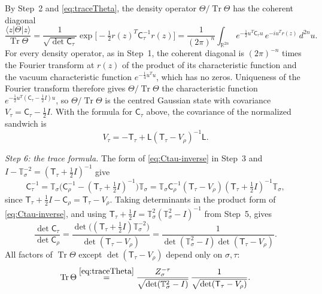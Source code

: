 \documentclass[11pt]{amsart}
\numberwithin{equation}{section}
\theoremstyle{definition}
\newcommand{\R}{\mathbb R}
\newcommand{\Tr}{\operatorname{Tr}}
\begin{document}
By Step~2 and \eqref{eq:traceTheta}, the density operator
\(\Theta/{\Tr\Theta}\) has the coherent diagonal
\[
 \frac{\langle z|\Theta|z\rangle}{\Tr\Theta}
 =\frac1{\sqrt{\det\mathsf C_\tau}}
  \exp\bigl[-\tfrac12r(z)^T\mathsf C_\tau^{-1}r(z)\bigr]
 =\frac1{(2\pi)^n}\int_{\R^{2n}}
  e^{-\frac12u^T\mathsf C_\tau u}\,e^{-iu^Tr(z)}\,d^{2n}u .
\]
For every density operator, as in Step~1, the coherent diagonal is
\((2\pi)^{-n}\) times the Fourier transform at \(r(z)\) of the product
of its characteristic function and the vacuum characteristic function
\(e^{-\frac14u^Tu}\), which has no zeros. Uniqueness of the Fourier
transform therefore gives \(\Theta/{\Tr\Theta}\) the characteristic
function \(e^{-\frac12u^T(\mathsf C_\tau-\frac12I)u}\), so
\(\Theta/{\Tr\Theta}\) is the centred Gaussian state with covariance
\(V_\tau=\mathsf C_\tau-\tfrac12I\). With the formula for
\(\mathsf C_\tau\) above, the covariance of the normalized sandwich is
\begin{equation}
 V_\tau
 =-\mathsf T_\tau+\mathsf L(\mathsf T_\tau-V_\rho)^{-1}\mathsf L.
 \label{eq:Vtau-derived}
\end{equation}

\smallskip
\emph{Step 6: the trace formula.} The form of
\eqref{eq:Ctau-inverse} in Step~3 and
\(I-\mathbb T_\sigma^{-2}=(\mathsf T_\tau+\tfrac12I)^{-1}\) give
\[
 \mathsf C_\tau^{-1}
 =\mathbb T_\sigma\bigl(\mathsf C_\rho^{-1}
  -(\mathsf T_\tau+\tfrac12I)^{-1}\bigr)\mathbb T_\sigma
 =\mathbb T_\sigma\mathsf C_\rho^{-1}(\mathsf T_\tau-V_\rho)
  (\mathsf T_\tau+\tfrac12I)^{-1}\mathbb T_\sigma ,
\]
since \(\mathsf T_\tau+\tfrac12I-\mathsf C_\rho=\mathsf T_\tau-V_\rho\).
Taking determinants in the product form of \eqref{eq:Ctau-inverse}, and using
\(\mathsf T_\tau+\tfrac12I=\mathbb T_\sigma^2(\mathbb T_\sigma^2-I)^{-1}\)
from Step~5, gives
\[
 \frac{\det\mathsf C_\tau}{\det\mathsf C_\rho}
 =\frac{\det\bigl((\mathsf T_\tau+\tfrac12I)\mathbb T_\sigma^{-2}\bigr)}
  {\det(\mathsf T_\tau-V_\rho)}
 =
 \frac1{
 \det(\mathbb T_\sigma^2-I)\det(\mathsf T_\tau-V_\rho)}.
\]
All factors of \(\Tr\Theta\) except \(\det(\mathsf T_\tau-V_\rho)\) depend only on
\(\sigma,\tau\):
\[
 \Tr\Theta
 \overset{\eqref{eq:traceTheta}}{=}
 \frac{Z_\sigma^{-\tau}}{\sqrt{\det(\mathbb T_\sigma^2-I)}}\,
 \frac1{\sqrt{\det(\mathsf T_\tau-V_\rho)}} .
\]
\end{document}
